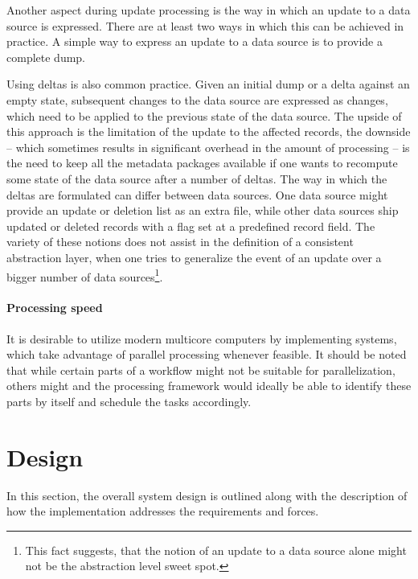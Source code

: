 \documentclass[english]{lni}
\begin{document}
    Another aspect during update processing is the way in which an update
    to a data source is expressed. There are at least two ways in which this can be
    achieved in practice. A simple way to express an update to a data source is to provide a complete dump.

    Using deltas is also common practice. Given an initial dump or a delta against an empty state,
        subsequent changes to the data source are expressed as changes, which
        need to be applied to the previous state of the data source. The upside
        of this approach is the limitation of the update to the affected
        records, the downside -- which sometimes results in significant
        overhead in the amount of processing -- is the need to keep all the metadata
        packages available if one wants to recompute some state of the data
        source after a number of deltas. The way in which the deltas are formulated can differ
        between data sources. One data source might provide an
        update or deletion list as an extra file, while other data sources
        ship updated or deleted records with a flag set at a predefined record field. The
        variety of these notions does not assist in the definition
        of a consistent abstraction layer, when one tries to generalize the
        event of an update over a bigger number of data sources\footnote{This fact suggests,
        that the notion of an update to a data source alone might not be
        the abstraction level sweet spot.}.

    \paragraph{Processing speed}
    It is desirable to utilize modern multicore
    computers by implementing systems, which take advantage of parallel processing
    whenever feasible. It should be noted that while certain parts of a workflow
    might not be suitable for parallelization, others might and the processing
    framework would ideally be able to identify these parts by itself
    and schedule the tasks accordingly.

\section{Design}
\label{design}

In this section, the overall system design is outlined along with the
description of how the implementation addresses the requirements and forces.
\end{document}
